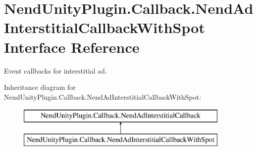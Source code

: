 \hypertarget{interface_nend_unity_plugin_1_1_callback_1_1_nend_ad_interstitial_callback_with_spot}{}\section{Nend\+Unity\+Plugin.\+Callback.\+Nend\+Ad\+Interstitial\+Callback\+With\+Spot Interface Reference}
\label{interface_nend_unity_plugin_1_1_callback_1_1_nend_ad_interstitial_callback_with_spot}


Event callbacks for interstitial ad.  


Inheritance diagram for Nend\+Unity\+Plugin.\+Callback.\+Nend\+Ad\+Interstitial\+Callback\+With\+Spot\+:\begin{figure}[H]
\begin{center}
\leavevmode
\includegraphics[height=2.000000cm]{interface_nend_unity_plugin_1_1_callback_1_1_nend_ad_interstitial_callback_with_spot}
\end{center}
\end{figure}
